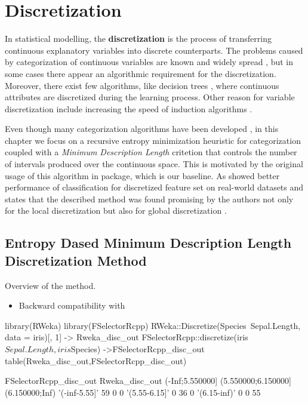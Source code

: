 \section{Discretization}\label{discretization}

In statistical modelling, the \textbf{discretization} is the process of
transferring continuous explanatory variables into discrete
counterparts. The problems caused by categorization of continuous
variables are known and widely spread \citep{HarrellDISC}, but in some
cases there appear an algorithmic requirement for the discretization.
Moreover, there exist few algorithms, like decision trees
\citep{Salzberg1994}, where continuous attributes are discretized during
the learning process. Other reason for variable discretization include
increasing the speed of induction algorithms \citep{Catlett1991}.
\par Even though many categorization algorithms have been developed
\citep{Holte1993, Chan169942}, in this chapter we focus on a recursive
entropy minimization heuristic for categorization coupled with a
\emph{Minimum Description Length} critetion \citep{rissanen1986} that
controls the number of intervals produced over the continuous space.
This is motivated by the original usage of this algorithm in
 package, which is our baseline. As
\cite{Dougherty95supervisedand} showed better performance of
classification for discretized feature set on real-world datasets and
states that the described method was found promising by the authors not
only for the local discretization but also for global discretization
\citep{Ting94discretizationof}.

\subsection{Entropy Dased Minimum Description Length Discretization
Method}\label{entropy-dased-minimum-description-length-discretization-method}

Overview of the method.

\begin{itemize}
\tightlist
\item
  Backward compatibility with 
\end{itemize}

\begin{Schunk}
\begin{Sinput}
library(RWeka)
library(FSelectorRcpp)
RWeka::Discretize(Species~Sepal.Length, data = iris)[, 1] -> Rweka_disc_out
FSelectorRcpp::discretize(iris$Sepal.Length, iris$Species) ->FSelectorRcpp_disc_out
table(Rweka_disc_out,FSelectorRcpp_disc_out)
\end{Sinput}
\begin{Soutput}
               FSelectorRcpp_disc_out
Rweka_disc_out  (-Inf;5.550000] (5.550000;6.150000] (6.150000;Inf)
  '(-inf-5.55]'              59                   0              0
  '(5.55-6.15]'               0                  36              0
  '(6.15-inf)'                0                   0             55
\end{Soutput}
\end{Schunk}

